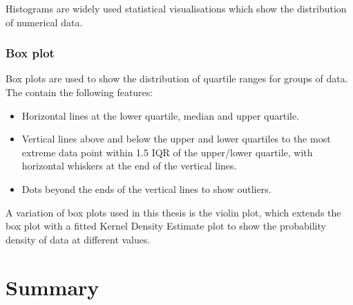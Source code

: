 Histograms are widely used statistical visualisations which show the
distribution of numerical data.


\subsubsection{Box plot}

Box plots are used to show the distribution of quartile ranges for
groups of data. The contain the following features:

\begin{itemize}
\item Horizontal lines at the lower quartile, median and upper
  quartile.
\item Vertical lines above and below the upper and lower quartiles to
  the most extreme data point within 1.5 IQR of the upper/lower
  quartile, with horizontal whiskers at the end of the vertical lines.
\item Dots beyond the ends of the vertical lines to show outliers.
\end{itemize}

A variation of box plots used in this thesis is the violin plot, which
extends the box plot with a fitted Kernel Density Estimate plot to
show the probability density of data at different values.


\section{Summary}
